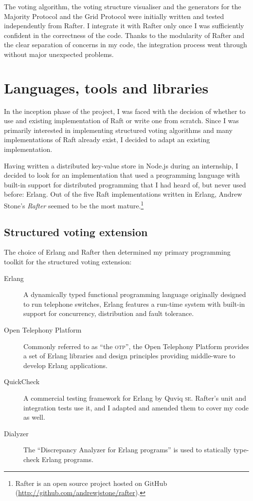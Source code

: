 \documentclass[12pt,chapterprefix=true,toc=bibliography,numbers=noendperiod,
               footnotes=multiple,twoside]{scrreprt}
\begin{document}
The voting algorithm, the voting structure visualiser and the generators for the Majority Protocol and the Grid Protocol were initially written and tested independently from Rafter. I integrate it with Rafter only once I was sufficiently confident in the correctness of the code. Thanks to the modularity of Rafter and the clear separation of concerns in my code, the integration process went through without major unexpected problems.

\section{Languages, tools and libraries}
\label{sc:tools}

In the inception phase of the project, I was faced with the decision of whether to use and existing implementation of Raft or write one from scratch. Since I was primarily interested in implementing structured voting algorithms and many implementations of Raft already exist, I decided to adapt an existing implementation.

Having written a distributed key-value store in Node.js during an internship, I decided to look for an implementation that used a programming language with built-in support for distributed programming that I had heard of, but never used before: Erlang. Out of the five Raft implementations written in Erlang, Andrew Stone's \emph{Rafter} seemed to be the most mature.\footnote{Rafter is an open source project hosted on GitHub (\url{http://github.com/andrewjstone/rafter}).}

\subsection{Structured voting extension}

The choice of Erlang and Rafter then determined my primary programming toolkit for the structured voting extension:

\begin{description}
    \item[Erlang] A dynamically typed functional programming language originally designed to run telephone switches, Erlang features a run-time system with built-in support for concurrency, distribution and fault tolerance.
    \item[Open Telephony Platform] Commonly referred to as \enquote{the \textsc{otp}}, the Open Telephony Platform provides a set of Erlang libraries and design principles providing middle-ware to develop Erlang applications.
    \item[QuickCheck] A commercial testing framework for Erlang by Quviq \textsc{se}. Rafter's unit and integration tests use it, and I adapted and amended them to cover my code as well.
    \item[Dialyzer] The \enquote{Discrepancy Analyzer for Erlang programs} is used to statically type-check Erlang programs.
\end{description}
\end{document}
